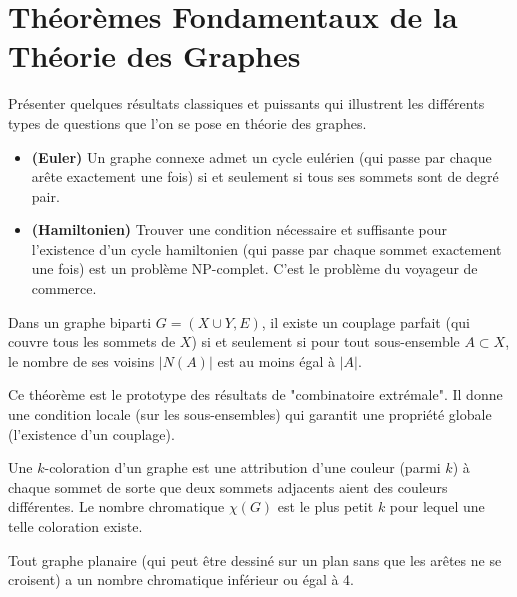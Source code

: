 \section{Théorèmes Fondamentaux de la Théorie des Graphes}

\begin{objectif}
    Présenter quelques résultats classiques et puissants qui illustrent les différents types de questions que l'on se pose en théorie des graphes.
\end{objectif}

\begin{theorem}
    \begin{itemize}
        \item \textbf{(Euler)} Un graphe connexe admet un cycle eulérien (qui passe par chaque arête exactement une fois) si et seulement si tous ses sommets sont de degré pair.
        \item \textbf{(Hamiltonien)} Trouver une condition nécessaire et suffisante pour l'existence d'un cycle hamiltonien (qui passe par chaque sommet exactement une fois) est un problème NP-complet. C'est le problème du voyageur de commerce.
    \end{itemize}
\end{theorem}

\begin{theorem}
    Dans un graphe biparti $G=(X \cup Y, E)$, il existe un couplage parfait (qui couvre tous les sommets de $X$) si et seulement si pour tout sous-ensemble $A \subset X$, le nombre de ses voisins $|N(A)|$ est au moins égal à $|A|$.
\end{theorem}
\begin{remark}
    Ce théorème est le prototype des résultats de "combinatoire extrémale". Il donne une condition locale (sur les sous-ensembles) qui garantit une propriété globale (l'existence d'un couplage).
\end{remark}

\begin{definition}
    Une $k$-coloration d'un graphe est une attribution d'une couleur (parmi $k$) à chaque sommet de sorte que deux sommets adjacents aient des couleurs différentes. Le nombre chromatique $\chi(G)$ est le plus petit $k$ pour lequel une telle coloration existe.
\end{definition}

\begin{theorem}
    Tout graphe planaire (qui peut être dessiné sur un plan sans que les arêtes ne se croisent) a un nombre chromatique inférieur ou égal à 4.
\end{theorem}

